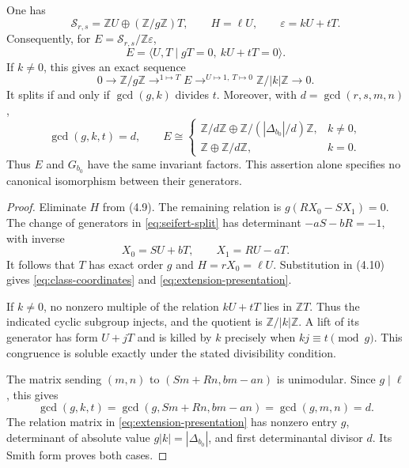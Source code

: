 \documentclass[11pt]{article}
\numberwithin{equation}{section}
\begin{document}
\begin{theorem}\label{thm:extension}
One has
\begin{equation}\label{eq:class-coordinates}
 \mathcal S_{r,s}=\mathbb ZU\oplus(\mathbb Z/g\mathbb Z)T,
 \qquad H=\ell U,\qquad \varepsilon=kU+tT.
\end{equation}
Consequently, for $E=\mathcal S_{r,s}/\mathbb Z\varepsilon$,
\begin{equation}\label{eq:extension-presentation}
 E=\langle U,T\mid gT=0,\ kU+tT=0\rangle.
\end{equation}
If $k\ne0$, this gives an exact sequence
\begin{equation}\label{eq:extension-sequence}
 0\longrightarrow\mathbb Z/g\mathbb Z
 \mathrel{\mathop{\longrightarrow}^{1\mapsto T}}E
 \mathrel{\mathop{\longrightarrow}^{U\mapsto1,\ T\mapsto0}}
 \mathbb Z/|k|\mathbb Z\longrightarrow0.
\end{equation}
It splits if and only if $\gcd(g,k)$ divides $t$.
Moreover, with $d=\gcd(r,s,m,n)$,
\[
 \gcd(g,k,t)=d,\qquad
 E\cong
 \begin{cases}
 \mathbb Z/d\mathbb Z\oplus\mathbb Z/(|\Delta_{b_0}|/d)\mathbb Z,
       &k\ne0,\\
 \mathbb Z\oplus\mathbb Z/d\mathbb Z,&k=0.
 \end{cases}
\]
Thus $E$ and $G_{b_0}$ have the same invariant factors.
This assertion alone specifies no canonical isomorphism between their generators.
\end{theorem}

\begin{proof}
Eliminate $H$ from (4.9).  The remaining relation is
$g(RX_0-SX_1)=0$.  The change of generators in
\eqref{eq:seifert-split} has determinant $-aS-bR=-1$, with inverse
\[
             X_0=SU+bT,\qquad X_1=RU-aT.
\]
It follows that $T$ has exact order $g$ and $H=rX_0=\ell U$.
Substitution in (4.10) gives \eqref{eq:class-coordinates} and
\eqref{eq:extension-presentation}.

If $k\ne0$, no nonzero multiple of the relation $kU+tT$ lies in
$\mathbb ZT$.  Thus the indicated cyclic subgroup injects, and the
quotient is $\mathbb Z/|k|\mathbb Z$.  A lift of its generator has
form $U+jT$ and is killed by $k$ precisely when
$kj\equiv t\pmod g$.  This congruence is soluble exactly under the
stated divisibility condition.

The matrix sending $(m,n)$ to $(Sm+Rn,bm-an)$ is unimodular.
Since $g\mid\ell$, this gives
\[
 \gcd(g,k,t)=\gcd(g,Sm+Rn,bm-an)=\gcd(g,m,n)=d.
\]
The relation matrix in \eqref{eq:extension-presentation} has nonzero
entry $g$, determinant of absolute value $g|k|=|\Delta_{b_0}|$,
and first determinantal divisor $d$.  Its Smith form proves both cases.
\end{proof}
\end{document}
